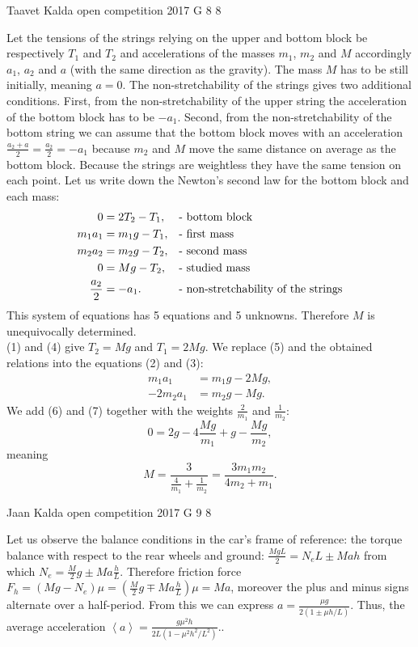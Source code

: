 \documentclass[11pt]{article}
\begin{document}
{Taavet Kalda} %
{open competition} %
{2017} %
{G 8} %
{8} %
{

\ifEngSolution
Let the tensions of the strings relying on the upper and bottom block be respectively $T_1$ and $T_2$ and accelerations of the masses $m_1$, $m_2$ and $M$ accordingly $a_1$, $a_2$ and $a$ (with the same direction as the gravity). The mass $M$ has to be still initially, meaning $a = 0$. The non-stretchability of the strings gives two additional conditions. First, from the non-stretchability of the upper string the acceleration of the bottom block has to be $-a_1$. Second, from the non-stretchability of the bottom string we can assume that the bottom block moves with an acceleration $\frac{a_2 + a}{2} = \frac{a_2}{2} = -a_1$ because $m_2$ and $M$ move the same distance on average as the bottom block. Because the strings are weightless they have the same tension on each point. Let us write down the Newton’s second law for the bottom block and each mass:
\begin{align}
0 &= 2T_2 - T_1,				& &\text{- bottom block}\label{Plokid:eq-1}\\
m_1a_1 &= m_1g - T_1,			& &\text{- first mass}\label{Plokid:eq-2}\\
m_2a_2 &= m_2g - T_2,			& &\text{- second mass}\label{Plokid:eq-3}\\
0 &= Mg - T_2,					& &\text{- studied mass}\label{Plokid:eq-4}\\
\frac{a_2}{2} &= -a_1.			& &\text{- non-stretchability of the strings\label{Plokid:eq-5}}
\end{align} 
This system of equations has 5 equations and 5 unknowns. Therefore $M$ is unequivocally determined.\\
(1) and (4) give $T_2 = Mg$ and $T_1 = 2Mg$. We replace (5) and the obtained relations into the equations (2) and (3):
\begin{align}
m_1a_1 &= m_1g - 2Mg, \label{Plokid:eq-6}\\
-2m_2a_1 &= m_2g - Mg. \label{Plokid:eq-7}
\end{align} 
We add (6) and (7) together with the weights $\frac{2}{m_1}$ and $\frac{1}{m_2}$:
\[
0 = 2g - 4\frac{Mg}{m_1} + g - \frac{Mg}{m_2},
\] 
meaning
\[
M = \frac{3}{\frac{4}{m_1} + \frac{1}{m_2}} = \frac{3m_1m_2}{4m_2 + m_1}.
\]
\fi
}

{Jaan Kalda} %
{open competition} %
{2017} %
{G 9} %
{8} %
{

\ifEngSolution
Let us observe the balance conditions in the car’s frame of reference: the torque balance with respect to the rear wheels and ground: $\frac {MgL}2=N_eL\pm Mah$ from which $N_e=\frac M2g\pm Ma\frac hL$. Therefore friction force $F_h=(Mg-N_e)\mu=(\frac M2g\mp Ma\frac hL)\mu=Ma$, moreover the plus and minus signs alternate over a half-period. From this we can express $a=\frac{\mu g}{2(1\pm \mu h/L)}$. Thus, the average acceleration $\left< a\right>=\frac{g\mu^2h}{2L(1-\mu^2h^2/L^2)}.$.
\fi
}
\end{document}
